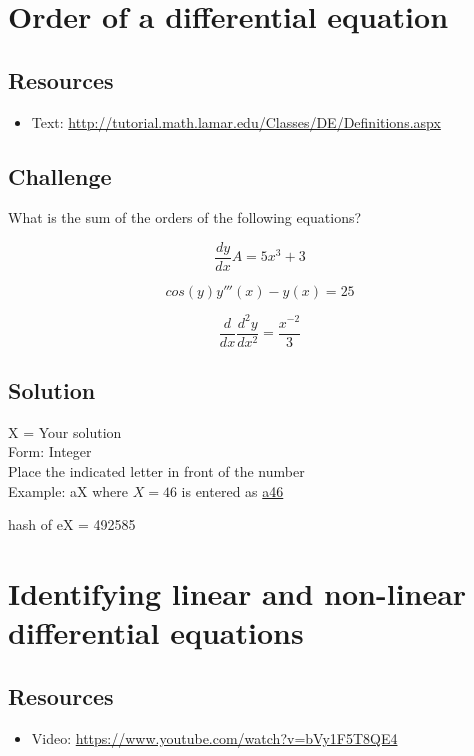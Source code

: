 \section{Order of a differential equation}

\subsection*{Resources}
\begin{itemize}
    \item Text: \url{http://tutorial.math.lamar.edu/Classes/DE/Definitions.aspx}
\end{itemize}

\subsection*{Challenge}
What is the sum of the orders of the following equations?

\begin{equation}
    \frac{dy}{dx}A = 5x^3 + 3
\end{equation}

\begin{equation}
    cos(y) y'''(x) - y(x) = 25
\end{equation}

\begin{equation}
    \frac{d}{dx} \frac{d^2 y}{dx^2} = \frac{x^{-2}}{3}
\end{equation}

\subsection*{Solution}
X = Your solution\\
Form: Integer\\
Place the indicated letter in front of the number\\
Example: aX where $X=46$ is entered as \href{http://www.wolframalpha.com/input/?i=md5+hash+of+\%22a46\%22}{a46}

hash of eX = 492585




\newpage
\section{Identifying linear and non-linear differential equations}

\subsection*{Resources}
\begin{itemize}
    \item Video: \url{https://www.youtube.com/watch?v=bVy1F5T8QE4}
\end{itemize}

